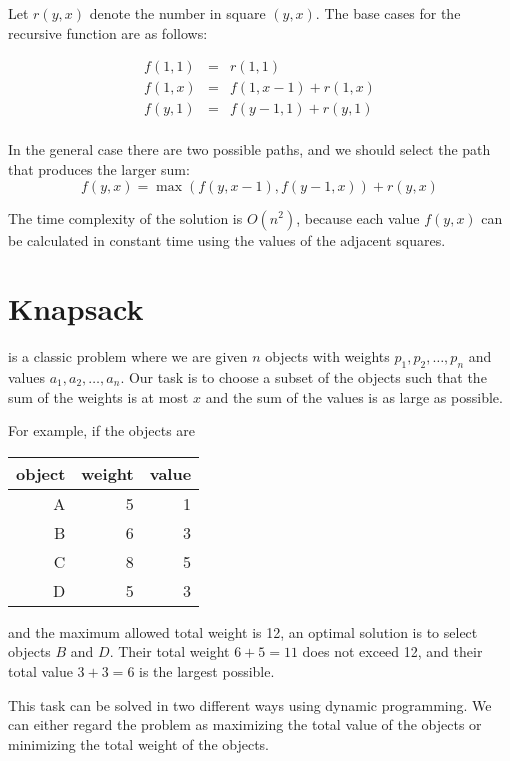 Let $r(y,x)$ denote the number in square $(y,x)$.
The base cases for the recursive function
are as follows:

\[
\begin{array}{lcl}
f(1,1) & = & r(1,1) \\
f(1,x) & = & f(1,x-1)+r(1,x) \\
f(y,1) & = & f(y-1,1)+r(y,1)\\
\end{array}
\]

In the general case there are two
possible paths, and we should select the path
that produces the larger sum:
\[ f(y,x) = \max(f(y,x-1),f(y-1,x))+r(y,x)\]

The time complexity of the solution is $O(n^2)$,
because each value $f(y,x)$ can be calculated
in constant time using the values of the
adjacent squares.

\section{Knapsack}


 is a classic problem where we
are given $n$ objects with weights
$p_1,p_2,\ldots,p_n$ and values
$a_1,a_2,\ldots,a_n$.
Our task is to choose a subset of the objects
such that the sum of the weights is at most $x$
and the sum of the values is as large as possible.

\begin{samepage}
For example, if the objects are
\begin{center}
\begin{tabular}{rrr}
object & weight & value \\
\hline
A & 5 & 1 \\
B & 6 & 3 \\
C & 8 & 5 \\
D & 5 & 3 \\
\end{tabular}
\end{center}
\end{samepage}
and the maximum allowed total weight is 12,
an optimal solution is to select objects $B$ and $D$.
Their total weight $6+5=11$ does not exceed 12,
and their total value $3+3=6$ is the largest possible.

This task can be solved in two different ways
using dynamic programming.
We can either regard the problem as maximizing the
total value of the objects or 
minimizing the total weight of the objects.

